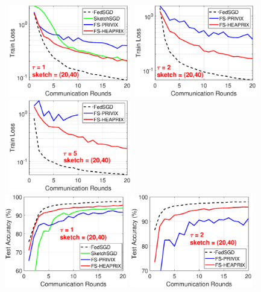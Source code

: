 \documentclass[twoside]{article}
\begin{document}
\clearpage

\begin{figure}[H]
	\begin{center}
		\mbox{			    \includegraphics[width=2.1in]{MNIST_figures/local1_sketch20_iid1_train_loss.eps} \hspace{-0.2in}
		\includegraphics[width=2.1in]{MNIST_figures/local2_sketch20_iid1_train_loss.eps} \hspace{-0.2in}
		\includegraphics[width=2.1in]{MNIST_figures/local5_sketch20_iid1_train_loss.eps}
		}
		\mbox{
		\includegraphics[width=2.1in]{MNIST_figures/local1_sketch20_iid1_test_acc.eps} \hspace{-0.2in}
		\includegraphics[width=2.1in]{MNIST_figures/local2_sketch20_iid1_test_acc.eps} \hspace{-0.2in}
}
\end{center}
\end{figure}
\end{document}
